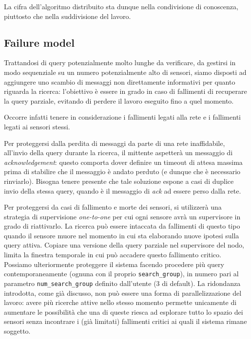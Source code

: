 \documentclass{llncs}
\begin{document}
La cifra dell'algoritmo distribuito sta dunque nella
condivisione di conoscenza, piuttosto che nella suddivisione del lavoro.

\subsection{Failure model}
Trattandosi di query potenzialmente molto lunghe da verificare,
da gestirsi in modo sequenziale su un numero potenzialmente alto di sensori,
siamo disposti ad aggiungere uno scambio di messaggi non direttamente
informativi per quanto riguarda la ricerca: l'obiettivo è essere in grado
in caso di fallimenti di recuperare la query parziale,
evitando di perdere il lavoro eseguito fino a quel momento.

Occorre infatti tenere in considerazione i fallimenti legati alla rete e i
fallimenti legati ai sensori stessi.

Per proteggersi dalla perdita di messaggi da parte di una rete inaffidabile,
all'invio della query durante la ricerca, il mittente aspetterà un messaggio
di \emph{acknowledgement}: questo comporta dover definire un timeout
di attesa massima prima di stabilire che il messaggio è andato perduto
(e dunque che è necessario rinviarlo).
Bisogna tenere presente che
tale soluzione espone a casi di duplice invio della stessa query,
quando è il messaggio di \emph{ack} ad essere perso dalla rete.

Per proteggersi da casi di fallimento e morte dei sensori,
si utilizzerà una strategia di supervisione \emph{one-to-one}
per cui ogni sensore avrà un supervisore in grado di riattivarlo.
La ricerca può essere intaccata da fallimenti di questo tipo
quando il sensore muore nel momento in cui sta elaborando
nuove ipotesi sulla query attiva.
Copiare una versione della query parziale nel supervisore del nodo,
limita la finestra temporale in cui può accadere questo fallimento
critico.
Possiamo ulteriormente proteggere il sistema facendo procedere
più query contemporaneamente (ognuna con il proprio \texttt{search\_group}),
in numero pari al parametro \texttt{num\_search\_group}
definito dall'utente (3 di default).
La ridondanza introdotta, come già discusso,
non può essere una forma di parallelizzazione del lavoro: avere
più ricerche attive nello stesso momento permette unicamente di
aumentare le possibilità che una di queste riesca ad esplorare
tutto lo spazio dei sensori senza incontrare i (già limitati)
fallimenti critici ai quali il sistema rimane soggetto.
\end{document}
